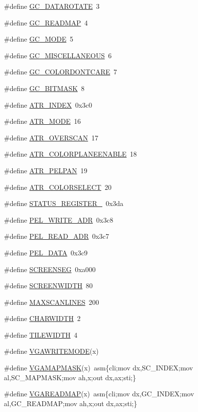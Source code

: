 \begin{DoxyCompactItemize}
\#define \hyperlink{ID__VL_8H_a7f73fc942e170071ccc44089bdfefda5}{GC\_\-DATAROTATE}~3
\item 
\#define \hyperlink{ID__VL_8H_a05e0548234030cf1bd7853ebb5329b68}{GC\_\-READMAP}~4
\item 
\#define \hyperlink{ID__VL_8H_a905ca51e0e01d01c850b6200148f99d8}{GC\_\-MODE}~5
\item 
\#define \hyperlink{ID__VL_8H_a84cfbb7767b3a4161050e2f1c9ec4f9c}{GC\_\-MISCELLANEOUS}~6
\item 
\#define \hyperlink{ID__VL_8H_a23bca07069a20a700685aa835a3fba83}{GC\_\-COLORDONTCARE}~7
\item 
\#define \hyperlink{ID__VL_8H_aedfe7e3a696381edff689f77ccced9e0}{GC\_\-BITMASK}~8
\item 
\#define \hyperlink{ID__VL_8H_adb443be6b040d1e9746f308df8a135d0}{ATR\_\-INDEX}~0x3c0
\item 
\#define \hyperlink{ID__VL_8H_a6a0f6c169d9c1e60fd272375e94284a0}{ATR\_\-MODE}~16
\item 
\#define \hyperlink{ID__VL_8H_a87a453ad89faa9cc918ab6696cfee037}{ATR\_\-OVERSCAN}~17
\item 
\#define \hyperlink{ID__VL_8H_a3e9c2be045b4448ab7c5bc7f4fe9f6ca}{ATR\_\-COLORPLANEENABLE}~18
\item 
\#define \hyperlink{ID__VL_8H_a8eb39dc54f2fa088b1d88d8012fbf155}{ATR\_\-PELPAN}~19
\item 
\#define \hyperlink{ID__VL_8H_a41cec1553ce7481786cbf7fcef639e86}{ATR\_\-COLORSELECT}~20
\item 
\#define \hyperlink{ID__VL_8H_addd64138cc5d632af1ea87872e642968}{STATUS\_\-REGISTER\_}~0x3da
\item 
\#define \hyperlink{ID__VL_8H_a14ccf92e149d850171920406cd4b425b}{PEL\_\-WRITE\_\-ADR}~0x3c8
\item 
\#define \hyperlink{ID__VL_8H_a857d96015db81d60033c25a42a33d8e7}{PEL\_\-READ\_\-ADR}~0x3c7
\item 
\#define \hyperlink{ID__VL_8H_ab5b9212a0d57fbd06cf0402c33614ffe}{PEL\_\-DATA}~0x3c9
\item 
\#define \hyperlink{ID__VL_8H_ae453594b95ad6a2675c3f583a95a9ef5}{SCREENSEG}~0xa000
\item 
\#define \hyperlink{ID__VL_8H_ada0cc738d27aad251151e69cb8d250e1}{SCREENWIDTH}~80
\item 
\#define \hyperlink{ID__VL_8H_ae8d720565cd28cc36ed5b5ecd8b12385}{MAXSCANLINES}~200
\item 
\#define \hyperlink{ID__VL_8H_a45952f78a0f44bd0ac30cd6d49631262}{CHARWIDTH}~2
\item 
\#define \hyperlink{ID__VL_8H_aaf51d37c25b200df1d73f79e19e354b7}{TILEWIDTH}~4
\item 
\#define \hyperlink{ID__VL_8H_ada6e67c70bc543ed5c19c0024b679114}{VGAWRITEMODE}(x)
\item 
\#define \hyperlink{ID__VL_8H_afdb80cdb3416d86ff5db26848b9ad69a}{VGAMAPMASK}(x)~asm\{cli;mov dx,SC\_\-INDEX;mov al,SC\_\-MAPMASK;mov ah,x;out dx,ax;sti;\}
\item 
\#define \hyperlink{ID__VL_8H_a9ed4ea126ce8056bcb12cfb192d04ab3}{VGAREADMAP}(x)~asm\{cli;mov dx,GC\_\-INDEX;mov al,GC\_\-READMAP;mov ah,x;out dx,ax;sti;\}
\end{DoxyCompactItemize}
